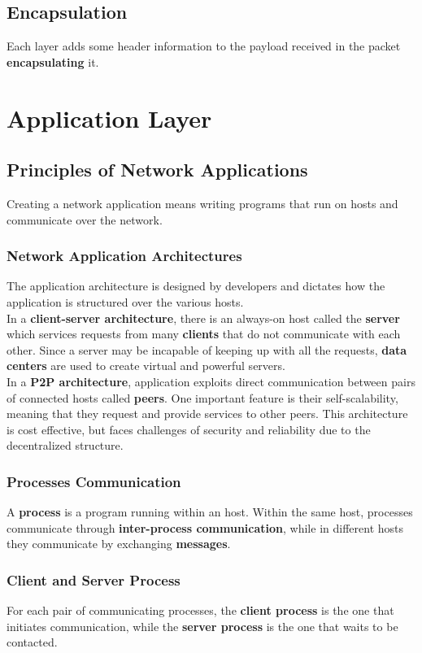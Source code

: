 \documentclass{article}
\begin{document}
\subsection{Encapsulation}
Each layer adds some header information to the payload received in the packet \textbf{encapsulating} it.

\newpage

\section{Application Layer}

\subsection{Principles of Network Applications}
Creating a network application means writing programs that run on hosts and communicate over the network.
\subsubsection{Network Application Architectures}
The application architecture is designed by developers and dictates how the application is structured over the various hosts. \\
In a \textbf{client-server architecture}, there is an always-on host called the \textbf{server} which services requests from many \textbf{clients} that do not communicate with each other. Since a server may be incapable of keeping up with all the requests, \textbf{data centers} are used to create virtual and powerful servers. \\
In a \textbf{P2P architecture}, application exploits direct communication between pairs of connected hosts called \textbf{peers}. One important feature is their self-scalability, meaning that they request and provide services to other peers. This architecture is cost effective, but faces challenges of security and reliability due to the decentralized structure.
\subsubsection{Processes Communication}
A \textbf{process} is a program running within an host.
Within the same host, processes communicate through \textbf{inter-process communication}, while in different hosts they communicate by exchanging \textbf{messages}.
\subsubsection*{Client and Server Process}
For each pair of communicating processes, the \textbf{client process} is the one that initiates communication, while the \textbf{server process} is the one that waits to be contacted.
\end{document}
